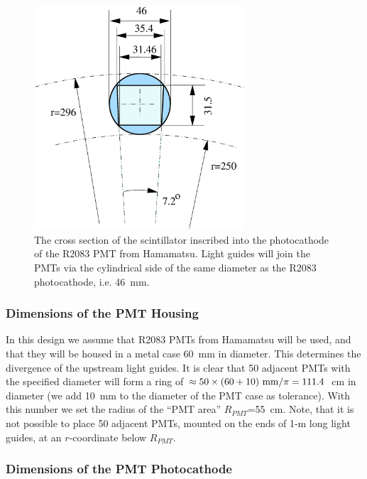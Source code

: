 \begin{figure}[htbp]
\centering
\includegraphics[width=0.7\textwidth]{t0sccross.ps}
\caption{\small{The cross section of the scintillator inscribed into the 
photocathode of the R2083 PMT from Hamamatsu.  Light guides will join the
PMTs via the cylindrical side of the same diameter as the R2083 photocathode,
i.e. 46~mm.}} 
\label{sccross}
\end{figure}

\subsubsection{Dimensions of the PMT Housing}

In this design we assume that R2083 PMTs from Hamamatsu will be used, and 
that they will be housed in a metal case 60~mm in diameter.  This 
determines the divergence of the upstream light guides.  It is clear that 
50 adjacent PMTs with the specified diameter will form a ring of 
$\approx 50\times (60+10)~{\rm mm}/\pi = 111.4$~cm in diameter (we add 
10~mm to the diameter of the PMT case as tolerance).  With this number we set 
the radius of the ``PMT area'' $R_{PMT}$=55~cm.  Note, that it is not possible 
to place 50 adjacent PMTs, mounted on the ends of 1-m long light guides, 
at an $r$-coordinate below $R_{PMT}$. 

\subsubsection{Dimensions of the PMT Photocathode}

